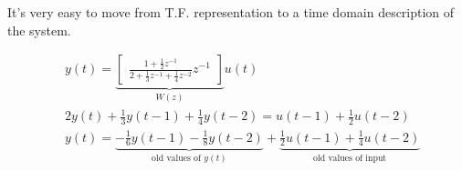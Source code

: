 It's very easy to move from T.F. representation to a time domain description of the system.

\begin{example}
    \begin{align*}
        & y(t) = \underbrace{\begin{bmatrix}
            \frac{1+\frac{1}{2}z^{-1}}{2+\frac{1}{3}z^{-1}+\frac{1}{4}z^{-2}} z^{-1}
        \end{bmatrix}}_{W(z)} u(t) \\
        & 2y(t) + \frac{1}{3}y(t-1) + \frac{1}{4}y(t-2) = u(t-1) + \frac{1}{2}u(t-2) \\
        & y(t) = \underbrace{-\frac{1}{6}y(t-1) - \frac{1}{8}y(t-2)}_\text{old values of $y(t)$} + \underbrace{\frac{1}{2}u(t-1) + \frac{1}{4}u(t-2)}_\text{old values of input}
    \end{align*}

\end{example}
